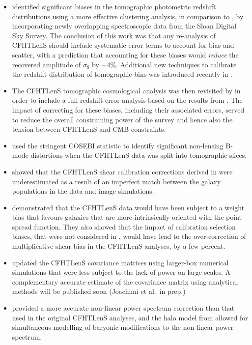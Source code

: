 \begin{itemize}
%
 \item{\citet{2016MNRAS.463.3737C} identified significant biases in the tomographic
photometric redshift distributions using a more effective clustering analysis,
in comparison to \citet{CFHTLenS-2pt-tomo}, by incorporating newly overlapping
spectroscopic data from the Sloan Digital Sky Survey.  The conclusion of this
work was that any re-analysis of CFHTLenS should include systematic error terms
to account for bias and scatter, with a prediction that accounting for these
biases would {\it reduce} the recovered amplitude of $\sigma_8$ by $\sim
4$\%. Additional new techniques to calibrate the redshift distribution of tomographic
bins was introduced recently in \cite{KiDS-450}.}
%
\item{The CFHTLenS tomographic cosmological analysis was then revisited by
\citet{joudaki/etal:2016} in order to include a full redshift error analysis
based on the results from \citet{2016MNRAS.463.3737C}.  The impact of
correcting for these biases, including their associated errors, served to
reduce the overall constraining power of the survey and hence also the tension
between CFHTLenS and CMB constraints.}
%
 \item{\cite{asgari/etal:2017} used the stringent COSEBI statistic
\citep{COSEBIs} to identify significant non-lensing B-mode distortions when the
CFHTLenS data was split into tomographic slices.}
%
\item{\citet{2015MNRAS.454.3500K} showed that the CFHTLenS shear calibration
corrections derived in \citet{CFHTLenS-shapes} were underestimated as a result
of an imperfect match between the galaxy populations in the data and image
simulations.}
%
\item{\citet{2016arXiv160605337F} demonstrated that the CFHTLenS data would
have been subject to a weight bias that favours galaxies that are more
intrinsically oriented with the point-spread function.  They also showed that
the impact of calibration selection biases, that were not considered in
\citet{CFHTLenS-shapes}, would have lead to the over-correction of
multiplicative shear bias in the CFHTLenS analyses, by a few percent.}
%
\item{\citet{joudaki/etal:2016} updated the CFHTLenS covariance matrices using
larger-box numerical simulations that were less subject to the lack of power on
large scales. A complementary accurate estimate of the covariance matrix using
analytical methods will be published soon (Joachimi et al.~in prep.)}
%
\item{\cite{2012ApJ...761..152T} provided a more accurate non-linear power
spectrum correction than that used in the original CFHTLenS analyses, and the
halo model from \cite{2015MNRAS.454.1958M} allowed for simultaneous modelling
of baryonic modifications to the non-linear power spectrum.} 
%
\end{itemize}
